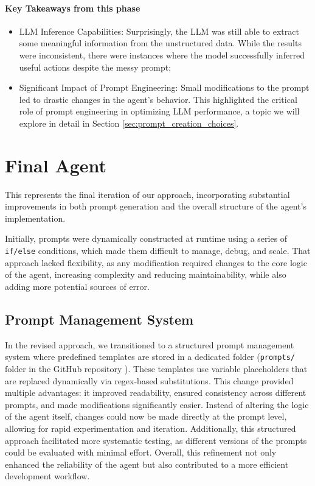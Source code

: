\paragraph{Key Takeaways from this phase}
\begin{itemize}
  \item LLM Inference Capabilities: Surprisingly, the LLM was still able to extract
    some meaningful information from the unstructured data. While the results
    were inconsistent, there were instances where the model successfully inferred
    useful actions despite the messy prompt;

  \item Significant Impact of Prompt Engineering: Small modifications to the
    prompt led to drastic changes in the agent's behavior. This highlighted the critical
    role of prompt engineering in optimizing LLM performance, a topic we will
    explore in detail in Section \ref{sec:prompt_creation_choices}.
\end{itemize}

\section{Final Agent}
\label{sec:final_agent}

This represents the final iteration of our approach, incorporating substantial
improvements in both prompt generation and the overall structure of the agent's
implementation.

Initially, prompts were dynamically constructed at runtime using a series of \texttt{if/else}
conditions, which made them difficult to manage, debug, and scale. That approach
lacked flexibility, as any modification required changes to the core logic of the
agent, increasing complexity and reducing maintainability, while also adding more
potential sources of error.

\subsection{Prompt Management System}
In the revised approach, we transitioned to a structured prompt management
system where predefined templates are stored in a dedicated folder (\texttt{prompts/}
folder in the GitHub repository \cite{projectrepo}). These templates use
variable placeholders that are replaced dynamically via regex-based
substitutions. This change provided multiple advantages: it improved readability,
ensured consistency across different prompts, and made modifications
significantly easier. Instead of altering the logic of the agent itself, changes
could now be made directly at the prompt level, allowing for rapid experimentation
and iteration. Additionally, this structured approach facilitated more systematic
testing, as different versions of the prompts could be evaluated with minimal
effort. Overall, this refinement not only enhanced the reliability of the agent
but also contributed to a more efficient development workflow.

